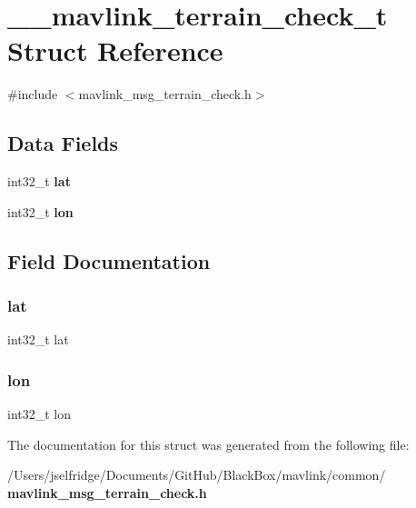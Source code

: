 \section{\+\_\+\+\_\+mavlink\+\_\+terrain\+\_\+check\+\_\+t Struct Reference}
\label{struct____mavlink__terrain__check__t}


{\ttfamily \#include $<$mavlink\+\_\+msg\+\_\+terrain\+\_\+check.\+h$>$}

\subsection*{Data Fields}
\begin{DoxyCompactItemize}
\item 
int32\+\_\+t \textbf{ lat}
\item 
int32\+\_\+t \textbf{ lon}
\end{DoxyCompactItemize}


\subsection{Field Documentation}
\mbox{\label{struct____mavlink__terrain__check__t_a58d1cfb46a8035aadcb0d2b3f178e1ed}} 
\subsubsection{lat}
{\footnotesize\ttfamily int32\+\_\+t lat}

\mbox{\label{struct____mavlink__terrain__check__t_a14be207fbed30fba5d322cb03bc5f228}} 
\subsubsection{lon}
{\footnotesize\ttfamily int32\+\_\+t lon}



The documentation for this struct was generated from the following file\+:\begin{DoxyCompactItemize}
\item 
/\+Users/jselfridge/\+Documents/\+Git\+Hub/\+Black\+Box/mavlink/common/\textbf{ mavlink\+\_\+msg\+\_\+terrain\+\_\+check.\+h}\end{DoxyCompactItemize}
